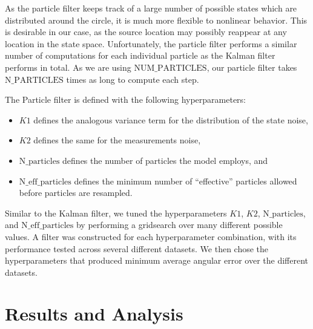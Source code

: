 \documentclass[11pt]{amsart}
\begin{document}
As the particle filter keeps track of a large number of possible states which are distributed around the circle, it is much more flexible to nonlinear behavior. This is desirable in our case, as the source location may possibly reappear at any 
location in the state space. Unfortunately, the particle filter performs a similar number of computations for each individual particle as the Kalman filter performs in total. As we are using $\text{NUM\_PARTICLES}$, our particle filter takes $\text{N\_PARTICLES}$ 
times as long to compute each step.

The Particle filter is defined with the following hyperparameters: 
\begin{itemize}
    \item $K1$ defines the analogous variance term for the distribution of the state noise,
    \item $K2$ defines the same for the measurements noise,
    \item $\text{N\_particles}$ defines the number of particles the model employs, and
    \item $\text{N\_eff\_particles}$ defines the minimum number of “effective” particles allowed before particles are resampled.
\end{itemize}

Similar to the Kalman filter, we tuned the hyperparameters $K1$, $K2$, $\text{N\_particles}$, and $\text{N\_eff\_particles}$ by performing a gridsearch over many different possible values. A filter was constructed for each hyperparameter combination, with its performance 
tested across several different datasets. We then chose the hyperparameters that produced minimum average angular error over the different datasets. 

\section{Results and Analysis}
\end{document}
